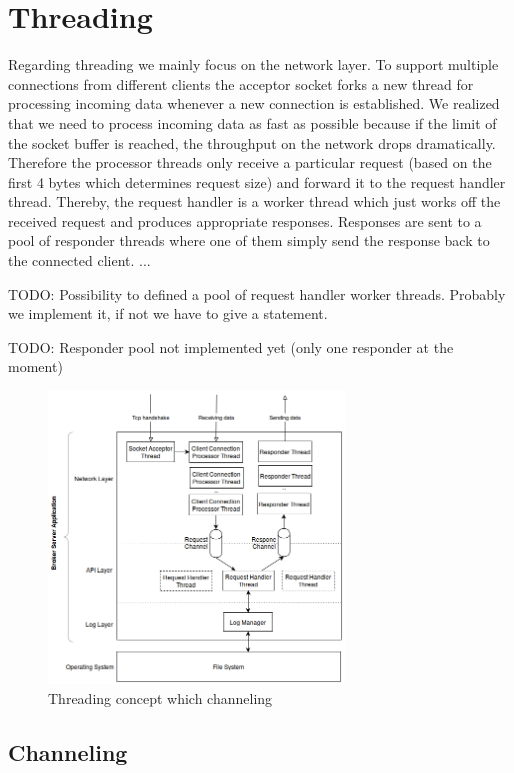 \section{Threading}
\label{sec:impl-broker-threading}
Regarding threading we mainly focus on the network layer. To support multiple
connections from different clients the acceptor socket forks a new thread for
processing incoming data whenever a new connection is established. We realized
that we need to process incoming data as fast as possible because if the limit
of the socket buffer is reached, the throughput on the network drops
dramatically. Therefore the processor threads only receive a
particular request (based on the first 4 bytes which determines request size)
and forward it to the request handler thread. Thereby, the request handler is a worker
thread which just works off the received request and produces appropriate
responses. Responses are sent to a pool of responder threads where one of them simply send the
response back to the connected client.
...

TODO: Possibility to defined a pool of request handler worker threads.
Probably we implement it, if not we have to give a statement. 

TODO: Responder pool not implemented yet (only one responder at the moment)

\begin{figure}[H]
    \centering
    \includegraphics[width=0.7\textwidth]{images/impl-brok-threading.png}
    \caption{Threading concept which channeling}
    \label{fig:impl-brok-threading}
\end{figure}

\subsection{Channeling}

